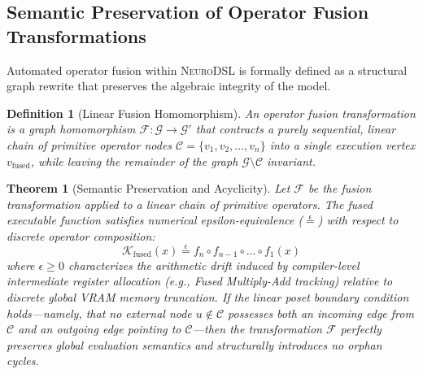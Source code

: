 \documentclass{article}
\newtheorem{theorem}{Theorem}
\newtheorem{definition}{Definition}
\begin{document}
\subsection{Semantic Preservation of Operator Fusion Transformations}

Automated operator fusion within \textsc{NeuroDSL} is formally defined as a structural graph rewrite that preserves the algebraic integrity of the model.

\begin{definition}[Linear Fusion Homomorphism]
An operator fusion transformation is a graph homomorphism $\mathcal{F}: \mathcal{G} \to \mathcal{G}'$ that contracts a purely sequential, linear chain of primitive operator nodes $\mathcal{C} = \{v_1, v_2, \dots, v_n\}$ into a single execution vertex $v_{\text{fused}}$, while leaving the remainder of the graph $\mathcal{G} \setminus \mathcal{C}$ invariant.
\end{definition}

\begin{theorem}[Semantic Preservation and Acyclicity]
Let $\mathcal{F}$ be the fusion transformation applied to a linear chain of primitive operators. The fused executable function satisfies numerical epsilon-equivalence ($\stackrel{\epsilon}{=}$) with respect to discrete operator composition:
\begin{equation}
\mathcal{K}_{\text{fused}}(x) \stackrel{\epsilon}{=} f_n \circ f_{n-1} \circ \dots \circ f_1(x)
\end{equation}
where $\epsilon \ge 0$ characterizes the arithmetic drift induced by compiler-level intermediate register allocation (e.g., Fused Multiply-Add tracking) relative to discrete global VRAM memory truncation. If the linear poset boundary condition holds—namely, that no external node $u \notin \mathcal{C}$ possesses both an incoming edge from $\mathcal{C}$ and an outgoing edge pointing to $\mathcal{C}$—then the transformation $\mathcal{F}$ perfectly preserves global evaluation semantics and structurally introduces no orphan cycles.
\end{theorem}
\end{document}

